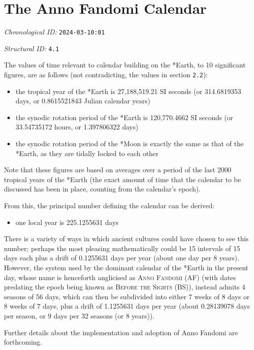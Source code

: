 \section{The Anno Fandomi Calendar}
\emph{Chronological ID:} \texttt{2024-03-10:01}

\emph{Structural ID:} \texttt{4.1}

The values of time relevant to calendar building on the *Earth, to 10 significant figures, are as follows (not contradicting, the values in section \texttt{2.2}):

\begin{itemize}
  \item the tropical year of the *Earth is 27,188,519.21 SI seconds (or 314.6819353 days, or 0.8615521843 Julian calendar years)
  \item the synodic rotation period of the *Earth is 120,770.4662 SI seconds (or 33.54735172 hours, or 1.397806322 days)
  \item the synodic rotation period of the *Moon is exactly the same as that of the *Earth, as they are tidally locked to each other
\end{itemize}

Note that these figures are based on averages over a period of the last 2000 tropical years of the *Earth (the exact amount of time that the calendar to be discussed has been in place, counting from the calendar's epoch).

From this, the principal number defining the calendar can be derived:

\begin{itemize}
  \item one local year is 225.1255631 days
\end{itemize}

There is a variety of ways in which ancient cultures could have chosen to see this number; perhaps the most pleasing mathematically could be 15 intervals of 15 days each plus a drift of 0.1255631 days per year (about one day per 8 years). However, the system used by the dominant calendar of the *Earth in the present day, whose name is henceforth anglicised as \textsc{Anno Fandomi} (AF) (with dates predating the epoch being known as \textsc{Before the Sights} (BS)), instead admits 4 seasons of 56 days, which can then be subdivided into either 7 weeks of 8 days or 8 weeks of 7 days, plus a drift of 1.1255631 days per year (about 0.28139078 days per season, or 9 days per 32 seasons (or 8 years)).

Further details about the implementation and adoption of Anno Fandomi are forthcoming.
\newpage
